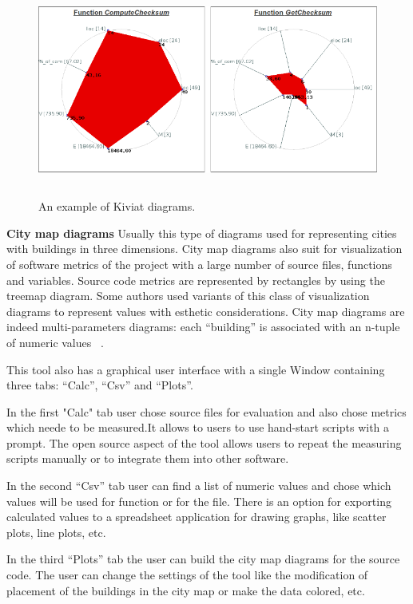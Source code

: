 \begin{figure}[h]
	\centering
	\includegraphics[height=70mm]{figures/metrix.png}
	\caption{An example of Kiviat diagrams.}
	\label{fig:metrix}
\end{figure}

\textbf{City map diagrams}
Usually this type of diagrams used for representing cities with buildings in three dimensions. City map diagrams also suit for visualization of software metrics of the project with a large number of source files, functions and variables. Source code metrics are represented by rectangles by using the treemap diagram. Some authors used variants of this class of visualization diagrams to represent  values with esthetic considerations. City map diagrams are indeed multi-parameters diagrams: each “building” is associated with an n-tuple of numeric values ~\cite{metrix}.  

This tool also has a graphical user interface with a single Window containing three tabs: “Calc”, “Csv” and “Plots”.

In the first "Calc" tab user chose source files for evaluation and also chose metrics which neede to be measured.It allows to users to use  hand-start scripts with a prompt. The open source aspect of the tool allows users to repeat the measuring scripts manually or to integrate them into other software.

In the second “Csv” tab user can find a list of numeric values and chose which values will be used for function or for the file. There is an option for exporting calculated values to a spreadsheet application for drawing graphs, like scatter plots, line plots, etc.

In the third “Plots” tab the user can build the city map diagrams for the source code. The user can change the settings of the tool like the modification of placement of the buildings in the city map or make the data colored, etc.

